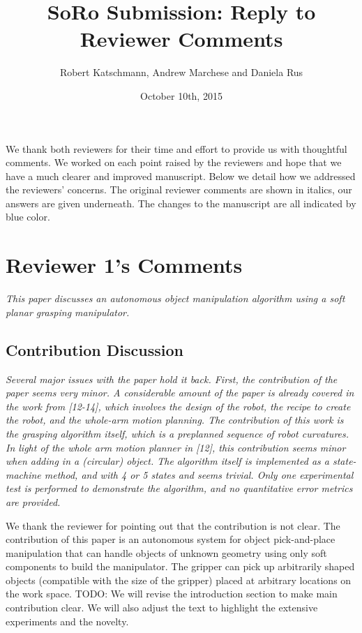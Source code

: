 \documentclass[letterpaper, 10 pt, twocolumn, conference]{article}
\begin{document}
\title{SoRo Submission: Reply to Reviewer Comments}
\author{Robert Katschmann, Andrew Marchese and Daniela Rus}
\date{October 10th, 2015}
\maketitle

We thank both reviewers for their time and effort to provide us with thoughtful comments. We worked on each point raised by the reviewers and hope that we have a much clearer and improved manuscript. Below we detail how we addressed the reviewers’ concerns. The original reviewer comments are shown in italics, our answers are given underneath. The changes to the manuscript are all indicated by blue color.


\section{Reviewer 1's Comments}

\textit{This paper discusses an autonomous object manipulation algorithm using a soft planar grasping manipulator.}

\subsection{Contribution Discussion}
\textit{Several major issues with the paper hold it back. First, the contribution of the paper seems very minor. A considerable amount of the paper is already covered in the work from [12-14], which involves the design of the robot, the recipe to create the robot, and the whole-arm motion planning. The contribution of this work is the grasping algorithm itself, which is a preplanned sequence of robot curvatures. In light of the whole arm motion planner in [12], this contribution seems minor when adding in a (circular) object.  The algorithm itself is implemented as a state-machine method, and with 4 or 5 states and seems trivial. Only one experimental test is performed to demonstrate the algorithm, and no quantitative error metrics are provided.}

We thank the reviewer for pointing out that the contribution is not clear. The contribution of this paper is an autonomous system for object pick-and-place manipulation that can handle objects of unknown geometry using only soft components to build the manipulator. The gripper can pick up arbitrarily shaped objects (compatible with the size of the gripper) placed at arbitrary locations on the work space. 
TODO: We will revise the introduction section to make main contribution clear. We will also adjust the text to highlight the extensive experiments and the novelty. 
\end{document}
